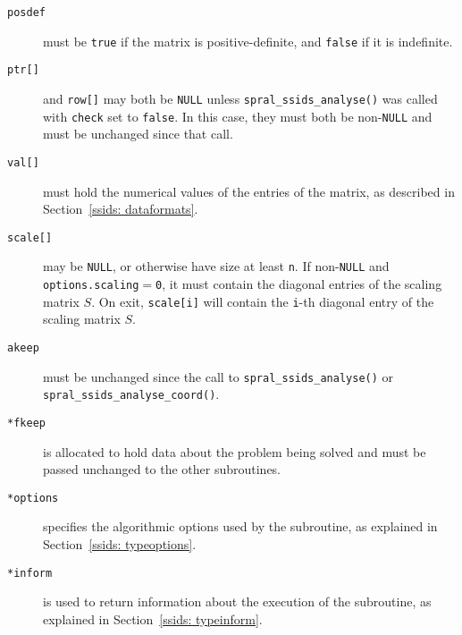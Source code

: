 \begin{description}
\item[\texttt{posdef}] must be {\tt true} if the matrix is positive-definite,
   and {\tt false} if it is indefinite.

\item[\texttt{ptr[]}] and {\tt row[]} may both be \texttt{NULL} unless 
   {\tt spral\_ssids\_analyse()} was called with {\tt check} set to {\tt false}.
   In this case, they must both be non-\texttt{NULL} and must be unchanged
   since that call.

\item[\texttt{val[]}] must hold the numerical values of the entries of the
   matrix, as described in Section~\ref{ssids: dataformats}.

\item[\texttt{scale[]}] may be \texttt{NULL}, or otherwise have size at least
   \texttt{n}. If non-\texttt{NULL} and \texttt{options.scaling}$=$\texttt{0},
   it must contain the diagonal entries of the scaling matrix ${S}$.
   On exit, \texttt{scale[i]} will contain the \texttt{i}-th
   diagonal entry of the scaling matrix $S$.

\item[\texttt{akeep}] must be unchanged since the call to
   {\tt spral\_ssids\_analyse()} or {\tt spral\_ssids\_analyse\_coord()}.

\item[\texttt{*fkeep}] is allocated to hold data about the problem being
   solved and must be passed unchanged to the other subroutines.

\item[\texttt{*options}] specifies the algorithmic options used by the
   subroutine, as explained in Section~\ref{ssids: typeoptions}.

\item[\texttt{*inform}] is used to return information about the execution
   of the subroutine, as explained in Section~\ref{ssids: typeinform}.

\end{description}

